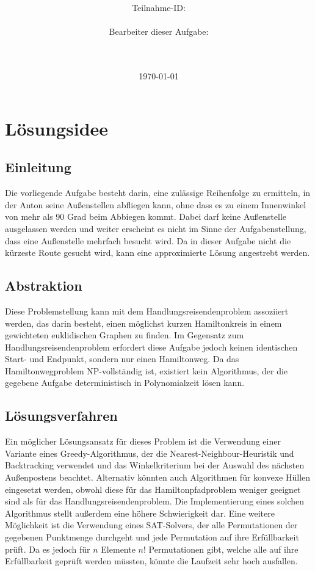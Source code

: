 \documentclass[a4paper,10pt,ngerman]{scrartcl}
\title{\textbf{\Huge\Aufgabe}}
\author{\LARGE Teilnahme-ID: \LARGE \TeilnahmeId \\\\
\LARGE Bearbeiter dieser Aufgabe: \\
\LARGE \Name\\\\}
\date{\LARGE\today}
\begin{document}
    \maketitle
    \tableofcontents
    \vspace{0.5cm}
    \newpage

    \section{Lösungsidee}\label{sec:losungsidee}
    \subsection{Einleitung}\label{subsec:einleitung}

    Die vorliegende Aufgabe besteht darin, eine zulässige Reihenfolge zu ermitteln,
    in der Anton seine Außenstellen abfliegen kann,
    ohne dass es zu einem Innenwinkel von mehr als 90 Grad beim Abbiegen kommt.
    Dabei darf keine Außenstelle ausgelassen werden und weiter erscheint es nicht im Sinne der Aufgabenstellung,
    dass eine Außenstelle mehrfach besucht wird.
    Da in dieser Aufgabe nicht die kürzeste Route gesucht wird, kann eine approximierte Lösung angestrebt werden.

    \subsection{Abstraktion}\label{subsec:abstraktion}

    Diese Problemstellung kann mit dem Handlungsreisendenproblem assoziiert werden,
    das darin besteht, einen möglichst kurzen Hamiltonkreis in einem gewichteten euklidischen Graphen zu finden.
    Im Gegensatz zum Handlungsreisendenproblem erfordert diese Aufgabe jedoch keinen identischen Start- und Endpunkt,
    sondern nur einen Hamiltonweg.
    Da das Hamiltonwegproblem NP-vollständig ist,
    existiert kein Algorithmus, der die gegebene Aufgabe deterministisch in Polynomialzeit lösen kann.
    \subsection{Lösungsverfahren}\label{subsec:losungsverfahren}
    Ein möglicher Lösungsansatz für dieses Problem ist die Verwendung einer Variante eines Greedy-Algorithmus,
    der die Nearest-Neighbour-Heuristik und Backtracking verwendet
    und das Winkelkriterium bei der Auswahl des nächsten Außenpostens beachtet.
    Alternativ könnten auch Algorithmen für konvexe Hüllen eingesetzt werden,
    obwohl diese für das Hamiltonpfadproblem weniger geeignet sind als für das Handlungsreisendenproblem.
    Die Implementierung eines solchen Algorithmus stellt außerdem eine höhere Schwierigkeit dar.
    Eine weitere Möglichkeit ist die Verwendung eines SAT-Solvers, der alle Permutationen der gegebenen Punktmenge durchgeht und
    jede Permutation auf ihre Erfüllbarkeit prüft.
    Da es jedoch für $n$ Elemente $n!$ Permutationen gibt, welche alle auf ihre Erfüllbarkeit geprüft werden müssten,
    könnte die Laufzeit sehr hoch ausfallen.
\end{document}
